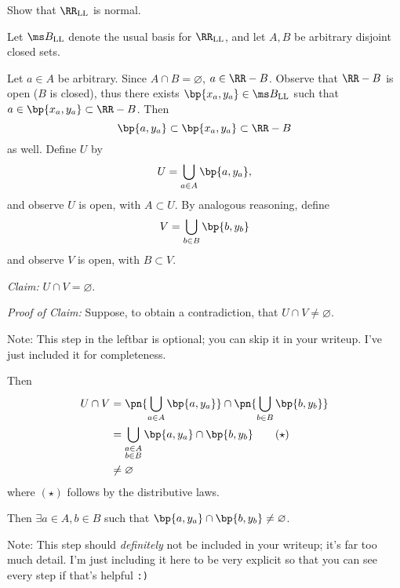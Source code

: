 \documentclass{fkpset}
\newcommand{\RRLL}{\ensuremath \RR_{\rm LL}}
\newcommand{\bll}{\ensuremath \ms B_{\rm LL}}
\begin{document}
  \begin{problem}[5.5]
    Show that $\RR_{\rm LL}$ is normal.
  \end{problem}
  \begin{solution}
    Let $\bll$ denote the usual basis for $\RRLL$, and let $A,B$ be
    arbitrary disjoint closed sets.

    Let $a \in A$ be arbitrary. Since $A \cap B = \varnothing$, $a \in
    \RR - B$. Observe that $\RR - B$ is open ($B$ is closed), thus
    there exists $\bp{x_a, y_a} \in \bll$ such that $a \in \bp{x_a,
      y_a} \subset \RR - B$. Then
    \[
      \bp{a, y_a} \subset \bp{x_a, y_a} \subset \RR - B
    \]
    as well. Define $U$ by
    \[
      U = \bigcup_{a \in A} \bp{a, y_a},
    \]
    and observe $U$ is open, with $A \subset U$. By analogous
    reasoning, define
    \[
      V = \bigcup_{b \in B} \bp{b, y_b}
    \]
    and observe $V$ is open, with $B \subset V$.

    \emph{Claim:} $U \cap V = \varnothing$.

    \emph{Proof of Claim:} Suppose, to obtain a contradiction, that $U
    \cap V \neq \varnothing$.
    \begin{leftbar}
      {\color{red}Note: This step in the leftbar is optional; you can
        skip it in your writeup. I've just included it for
        completeness.}

      Then
      \begin{align*}
        U \cap V
        &=
        \pn{\bigcup_{a\in A} \bp{a,y_a}} \cap \pn{\bigcup_{b \in B} \bp{b, y_b}} \\
        &= \bigcup_{\substack{a \in A \\ b \in B}}  \bp{a, y_a} \cap \bp{b, y_b} \tag{$\star$} \\
        &\neq \varnothing
      \end{align*}
      where $(\star)$ follows by the distributive laws.
    \end{leftbar}
    Then $\exists a \in A, b \in B$ such that $\bp{a,y_a} \cap \bp{b,
      y_b} \neq \varnothing$.
    \begin{leftbar}
      {\color{red} Note: This step should \emph{definitely} not be
        included in your writeup; it's far too much detail. I'm just
        including it here to be very explicit so that you can see
        every step if that's helpful \texttt{:)}}


\end{leftbar}
\end{solution}
\end{document}
